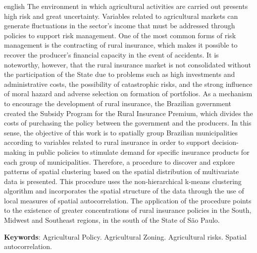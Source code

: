 \documentclass[
	12pt,				%
	openright,			%
	oneside,			%
	a4paper,			%
	chapter=TITLE,		%
	section=TITLE,		%
	english,			%
	french,				%
	spanish,			%
	brazil				%
	]{abntex2}
\begin{document}
\begin{resumo}
 \begin{otherlanguage*}{english}
\noindent  The environment in which agricultural activities are carried out presents high risk and great uncertainty. Variables related to agricultural markets can generate fluctuations in the sector's income that must be addressed through policies to support risk management. One of the most common forms of risk management is the contracting of rural insurance, which makes it possible to recover the producer's financial capacity in the event of accidents. It is noteworthy, however, that the rural insurance market is not consolidated without the participation of the State due to problems such as high investments and administrative costs, the possibility of catastrophic risks, and the strong influence of moral hazard and adverse selection on formation of portfolios. As a mechanism to encourage the development of rural insurance, the Brazilian government created the Subsidy Program for the Rural Insurance Premium, which divides the costs of purchasing the policy between the government and the producers. In this sense, the objective of this work is to spatially group Brazilian municipalities according to variables related to rural insurance in order to support decision-making in public policies to stimulate demand for specific insurance products for each group of municipalities. Therefore, a procedure to discover and explore patterns of spatial clustering based on the spatial distribution of multivariate data is presented. This procedure uses the non-hierarchical k-means clustering algorithm and incorporates the spatial structure of the data through the use of local measures of spatial autocorrelation. The application of the procedure points to the existence of greater concentrations of rural insurance policies in the South, Midwest and Southeast regions, in the south of the State of São Paulo. 


   \vspace{\onelineskip}
 
   \noindent 
   \textbf{Keywords}: Agricultural Policy. Agricultural Zoning. Agricultural risks. Spatial autocorrelation.

 \end{otherlanguage*}
\end{resumo}


\renewcommand{\listfigurename}{\textbf{Lista de Figuras}}
\pdfbookmark[0]{\listfigurename}{lof}
\listoffigures*
\cleardoublepage
\end{document}
